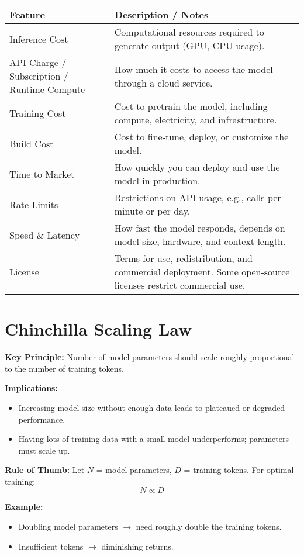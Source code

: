 \begin{tabularx}{\textwidth}{|>{\hsize}L|>{\hsize}L|}
\hline
\textbf{Feature} & \textbf{Description / Notes} \\
\hline
Inference Cost & Computational resources required to generate output (GPU, CPU usage). \\
\hline
API Charge / Subscription / Runtime Compute & How much it costs to access the model through a cloud service. \\
\hline
Training Cost & Cost to pretrain the model, including compute, electricity, and infrastructure. \\
\hline
Build Cost & Cost to fine-tune, deploy, or customize the model. \\
\hline
Time to Market & How quickly you can deploy and use the model in production. \\
\hline
Rate Limits & Restrictions on API usage, e.g., calls per minute or per day. \\
\hline
Speed \& Latency & How fast the model responds, depends on model size, hardware, and context length. \\
\hline
License & Terms for use, redistribution, and commercial deployment. Some open-source licenses restrict commercial use. \\
\hline
\end{tabularx}

\vspace{1em}

\section{Chinchilla Scaling Law}

\textbf{Key Principle:} Number of model parameters should scale roughly proportional to the number of training tokens.

\textbf{Implications:}
\begin{itemize}
    \item Increasing model size without enough data leads to plateaued or degraded performance.
    \item Having lots of training data with a small model underperforms; parameters must scale up.
\end{itemize}

\textbf{Rule of Thumb:} Let $N$ = model parameters, $D$ = training tokens. For optimal training:
\[
N \propto D
\]

\textbf{Example:}
\begin{itemize}
    \item Doubling model parameters $\rightarrow$ need roughly double the training tokens.
    \item Insufficient tokens $\rightarrow$ diminishing returns.
\end{itemize}

